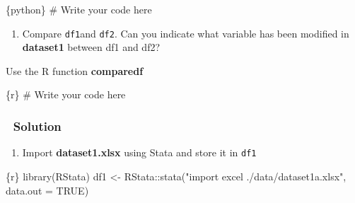 \documentclass[
  letterpaper,
  DIV=11,
  numbers=noendperiod,
  oneside]{scrreprt}
\newenvironment{Shaded}{\begin{snugshade}}{\end{snugshade}}
\newcommand{\AttributeTok}[1]{\textcolor[rgb]{0.40,0.45,0.13}{#1}}
\newcommand{\CommentTok}[1]{\textcolor[rgb]{0.37,0.37,0.37}{#1}}
\newcommand{\ConstantTok}[1]{\textcolor[rgb]{0.56,0.35,0.01}{#1}}
\newcommand{\FunctionTok}[1]{\textcolor[rgb]{0.28,0.35,0.67}{#1}}
\newcommand{\InformationTok}[1]{\textcolor[rgb]{0.37,0.37,0.37}{#1}}
\newcommand{\NormalTok}[1]{\textcolor[rgb]{0.00,0.23,0.31}{#1}}
\newcommand{\OtherTok}[1]{\textcolor[rgb]{0.00,0.23,0.31}{#1}}
\newcommand{\SpecialCharTok}[1]{\textcolor[rgb]{0.37,0.37,0.37}{#1}}
\newcommand{\StringTok}[1]{\textcolor[rgb]{0.13,0.47,0.30}{#1}}
\providecommand{\tightlist}{%
  \setlength{\itemsep}{0pt}\setlength{\parskip}{0pt}}\usepackage{longtable,booktabs,array}
\begin{document}
\begin{Shaded}
\begin{Highlighting}[]
\InformationTok{\textasciigrave{}\textasciigrave{}\textasciigrave{}\{python\}}
\CommentTok{\# Write your code here}
\InformationTok{\textasciigrave{}\textasciigrave{}\textasciigrave{}}
\end{Highlighting}
\end{Shaded}

\begin{enumerate}
\def\labelenumi{\arabic{enumi}.}
\setcounter{enumi}{2}
\tightlist
\item
  Compare \texttt{df1}and \texttt{df2}. Can you indicate what variable
  has been modified in \textbf{dataset1} between df1 and df2?
\end{enumerate}

\begin{tcolorbox}[enhanced jigsaw, coltitle=black, opacityback=0, title=\textcolor{quarto-callout-tip-color}{\faLightbulb}\hspace{0.5em}{Tip}, toprule=.15mm, bottomtitle=1mm, colbacktitle=quarto-callout-tip-color!10!white, colframe=quarto-callout-tip-color-frame, left=2mm, opacitybacktitle=0.6, bottomrule=.15mm, arc=.35mm, toptitle=1mm, colback=white, titlerule=0mm, breakable, leftrule=.75mm, rightrule=.15mm]

Use the R function \textbf{comparedf}

\end{tcolorbox}

\begin{Shaded}
\begin{Highlighting}[]
\InformationTok{\textasciigrave{}\textasciigrave{}\textasciigrave{}\{r\}}
\CommentTok{\# Write your code here}
\InformationTok{\textasciigrave{}\textasciigrave{}\textasciigrave{}}
\end{Highlighting}
\end{Shaded}

\subsubsection{\texorpdfstring{{👀} Solution}{👀 Solution}}

\begin{enumerate}
\def\labelenumi{\arabic{enumi}.}
\tightlist
\item
  Import \textbf{dataset1.xlsx} using Stata and store it in \texttt{df1}
\end{enumerate}

\begin{Shaded}
\begin{Highlighting}[]
\InformationTok{\textasciigrave{}\textasciigrave{}\textasciigrave{}\{r\}}
\FunctionTok{library}\NormalTok{(RStata)}
\NormalTok{df1 }\OtherTok{\textless{}{-}}\NormalTok{ RStata}\SpecialCharTok{::}\FunctionTok{stata}\NormalTok{(}\StringTok{"import excel ./data/dataset1a.xlsx"}\NormalTok{,}
                     \AttributeTok{data.out =} \ConstantTok{TRUE}\NormalTok{)}
\InformationTok{\textasciigrave{}\textasciigrave{}\textasciigrave{}}
\end{Highlighting}
\end{Shaded}
\end{document}
